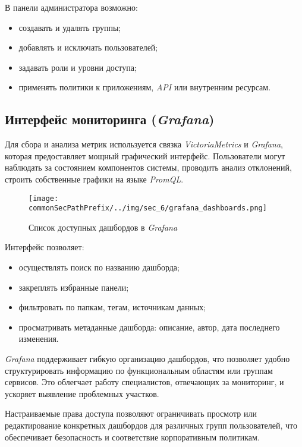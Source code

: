 В панели администратора возможно:
\begin{itemize}
    \item создавать и удалять группы;
    \item добавлять и исключать пользователей;
    \item задавать роли и уровни доступа;
    \item применять политики к приложениям, \textit{API} или внутренним ресурсам.
\end{itemize}

\subsection{Интерфейс мониторинга (\textit{Grafana})}

Для сбора и анализа метрик используется связка \textit{VictoriaMetrics} и \textit{Grafana}, которая предоставляет мощный графический интерфейс. Пользователи могут наблюдать за состоянием компонентов системы, проводить анализ отклонений, строить собственные графики на языке \textit{PromQL}.

\begin{figure}[ht]
    \centering
    \texttt{[image: \\commonSecPathPrefix/../img/sec\_6/grafana\_dashboards.png]}
    \caption{Список доступных дашбордов в \textit{Grafana}}
    \label{fig:user_guide:grafana_dashboards}
\end{figure}

Интерфейс позволяет:
\begin{itemize}
    \item осуществлять поиск по названию дашборда;
    \item закреплять избранные панели;
    \item фильтровать по папкам, тегам, источникам данных;
    \item просматривать метаданные дашборда: описание, автор, дата последнего изменения.
\end{itemize}

\textit{Grafana} поддерживает гибкую организацию дашбордов, что позволяет удобно структурировать информацию по функциональным областям или группам сервисов. Это облегчает работу специалистов, отвечающих за мониторинг, и ускоряет выявление проблемных участков.

Настраиваемые права доступа позволяют ограничивать просмотр или редактирование конкретных дашбордов для различных групп пользователей, что обеспечивает безопасность и соответствие корпоративным политикам.

